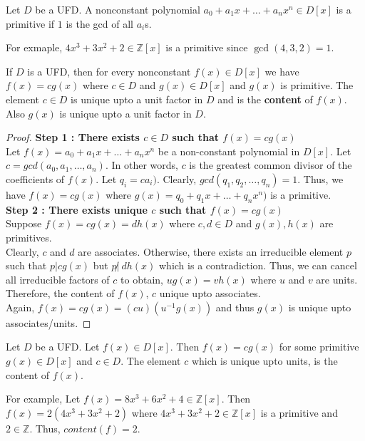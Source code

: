 \begin{definition}[primitive]
	Let $D$ be a UFD.
	A nonconstant polynomial $a_0 + a_1x + \dots + a_nx^n \in D[x]$ is a primitive if $1$ is the gcd of all $a_i$s.
\end{definition}
	For exmaple, $4x^3+3x^2+2 \in \mathbb{Z}[x]$ is a primitive since $\gcd(4,3,2) = 1$.

\begin{lemma}
	If $D$ is a UFD, then for every nonconstant $f(x) \in D[x]$ we have $f(x) = cg(x)$ where $c \in D$ and $g(x) \in D[x]$ and $g(x)$ is primitive.
	The element $c \in D$ is unique upto a unit factor in $D$ and is the \textbf{content} of $f(x)$.
	Also $g(x)$ is unique upto a unit factor in $D$.
\end{lemma}
\begin{proof}
	\textbf{Step 1 : There exists $c \in D$ such that $f(x) = cg(x)$}\\
	Let $f(x) = a_0 + a_1x + \dots +a_nx^n$ be a non-constant polynomial in $D[x]$.
	Let $c = gcd(a_0,a_1,\dots,a_n)$.
	In other words, $c$ is the greatest common divisor of the coefficients of $f(x)$.
	Let $q_i = ca_i)$.
	Clearly, $gcd(q_1,q_2,\dots,q_n) = 1$.
	Thus, we have $f(x) = cg(x)$ where $g(x) = q_0+q_1x+\dots+q_nx^n)$ is a primitive.\\

	\textbf{Step 2 : There exists unique $c$ such that  $f(x) = cg(x)$}\\
	Suppose $f(x) = cg(x) = dh(x)$ where $c,d \in D$ and $g(x), h(x)$ are primitives.\\

	Clearly, $c$ and $d$ are associates.
	Otherwise, there exists an irreducible element $p$ such that $p | cg(x)$ but $p\!\not|\ dh(x)$ which is a contradiction.
	Thus, we can cancel all irreducible factors of $c$ to obtain, $ug(x) = vh(x)$ where $u$ and $v$ are units.
	Therefore, the content of $f(x)$, $c$ unique upto associates.\\

	Again, $f(x) = cg(x) = (cu) (u^{-1}g(x))$ and thus $g(x)$ is unique upto associates/units.
\end{proof}

\begin{definition}[content]
	Let $D$ be a UFD.
	Let $f(x) \in D[x]$.
	Then $f(x) = cg(x)$ for some primitive $g(x) \in D[x]$ and $c \in D$.
	The element $c$ which is unique upto units, is the content of $f(x)$.
\end{definition}
	For example, Let $f(x) = 8x^3+6x^2+4 \in \mathbb{Z}[x]$.
	Then $f(x) = 2(4x^3+3x^2+2)$ where $4x^3+3x^2+2 \in \mathbb{Z}[x]$ is a primitive and $2 \in \mathbb{Z}$.
	Thus, $content(f) = 2$.

